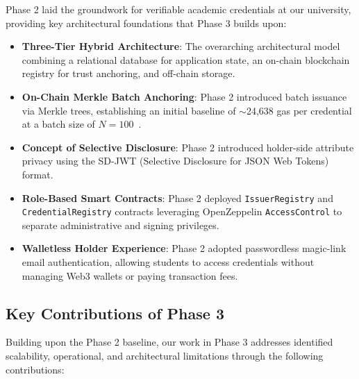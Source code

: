 Phase 2 laid the groundwork for verifiable academic credentials at our university, providing key architectural foundations that Phase 3 builds upon:
\begin{itemize}
    \item \textbf{Three-Tier Hybrid Architecture}: The overarching architectural model combining a relational database for application state, an on-chain blockchain registry for trust anchoring, and off-chain storage.
    \item \textbf{On-Chain Merkle Batch Anchoring}: Phase 2 introduced batch issuance via Merkle trees, establishing an initial baseline of $\sim$24,638 gas per credential at a batch size of $N=100$~\cite{Grech2017BlockchainInEducation}.
    \item \textbf{Concept of Selective Disclosure}: Phase 2 introduced holder-side attribute privacy using the SD-JWT (Selective Disclosure for JSON Web Tokens) format.
    \item \textbf{Role-Based Smart Contracts}: Phase 2 deployed \texttt{IssuerRegistry} and \texttt{CredentialRegistry} contracts leveraging OpenZeppelin \texttt{AccessControl} to separate administrative and signing privileges.
    \item \textbf{Walletless Holder Experience}: Phase 2 adopted passwordless magic-link email authentication, allowing students to access credentials without managing Web3 wallets or paying transaction fees.
\end{itemize}

\subsection{Key Contributions of Phase 3}

Building upon the Phase 2 baseline, our work in Phase 3 addresses identified scalability, operational, and architectural limitations through the following contributions:

